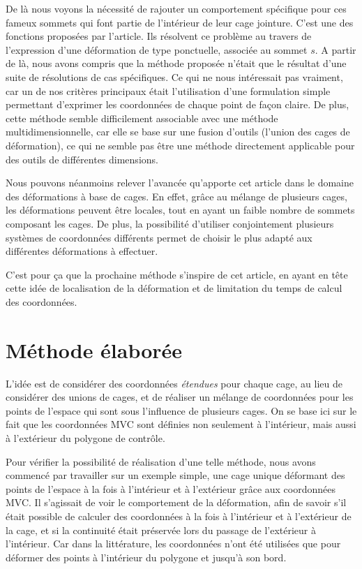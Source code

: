 De là nous voyons la nécessité de rajouter un comportement spécifique
pour ces fameux sommets qui font partie de l'intérieur de leur cage
jointure. C'est une des fonctions proposées par l'article. Ils
résolvent ce problème au travers de l'expression d'une déformation de
type ponctuelle, associée au sommet $s$. A partir de là, nous avons
compris que la méthode proposée \cite{GPCP13} n'était que le résultat
d'une suite de résolutions de cas spécifiques. Ce qui ne nous
intéressait pas vraiment, car un de nos critères principaux était
l'utilisation d'une formulation simple permettant d'exprimer les
coordonnées de chaque point de façon claire. De plus, cette méthode
semble difficilement associable avec une méthode multidimensionnelle,
car elle se base sur une fusion d'outils (l'union des cages de
déformation), ce qui ne semble pas être une méthode directement
applicable pour des outils de différentes dimensions.

Nous pouvons néanmoins relever l'avancée qu'apporte cet article dans
le domaine des déformations à base de cages. En effet, grâce au
mélange de plusieurs cages, les déformations peuvent être locales,
tout en ayant un faible nombre de sommets composant les cages. De
plus, la possibilité d'utiliser conjointement plusieurs systèmes de
coordonnées différents permet de choisir le plus adapté aux
différentes déformations à effectuer.

C'est pour ça que la prochaine méthode s'inspire de cet article, en
ayant en tête cette idée de localisation de la déformation et de
limitation du temps de calcul des coordonnées.

\section{Méthode élaborée}
L'idée est de considérer des coordonnées \textit{étendues} pour chaque
cage, au lieu de considérer des unions de cages, et de réaliser un
mélange de coordonnées pour les points de l'espace qui sont sous
l'influence de plusieurs cages. On se base ici sur le fait que les
coordonnées MVC sont définies non seulement à l'intérieur, mais aussi
à l'extérieur du polygone de contrôle.

Pour vérifier la possibilité de réalisation d'une telle méthode, nous
avons commencé par travailler sur un exemple simple, une cage unique
déformant des points de l'espace à la fois à l'intérieur et à
l'extérieur grâce aux coordonnées MVC. Il s'agissait de voir le
comportement de la déformation, afin de savoir s'il était possible de
calculer des coordonnées à la fois à l'intérieur et à l'extérieur de
la cage, et si la continuité était préservée lors du passage de
l'extérieur à l'intérieur. Car dans la littérature, les coordonnées
n'ont été utilisées que pour déformer des points à l'intérieur du
polygone et jusqu'à son bord.

